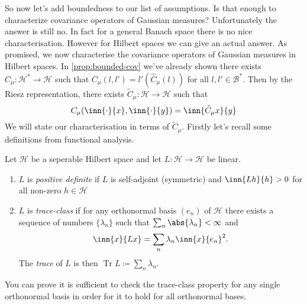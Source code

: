 \documentclass[fontsize=12pt, DIV=12]{scrreprt}
\newcommand{\defeq}{\coloneqq}
\newcommand{\calB}{\mathcal B}
\newcommand{\calH}{\mathcal H}
\DeclareMathOperator{\tr}{Tr}
\begin{document}
So now let's add boundedness to our list of assumptions. Is that enough to characterize covariance operators of Gaussian measures? Unfortunately the answer is still no. In fact for a general Banach space there is no nice characterisation. However for Hilbert spaces we can give an actual answer.
As promised, we now characterise the covariance operators of Gaussian measures in Hilbert spaces. In \vref{prop:bounded-cov} we've already shown there exists $\hat{C}_{\mu}: \calH^* \to \calH$ such that $C_{\mu}(l, l') = l'(\hat{C}_{\mu}(l))$ for all $l, l' \in \calB^*$. Then by the Riesz representation, there exists $\tilde{C}_{\mu}: \calH \to \calH$ such that
\begin{equation}
	C_{\mu}(\inn{\cdot}{x}, \inn{\cdot}{y}) = \inn{\tilde{C}_{\mu}x}{y}
\end{equation}
We will state our characterisation in terms of $\tilde{C}_{\mu}$. Firstly let's recall some definitions from functional analysis.
\begin{defn}
	Let $\calH$ be a seperable Hilbert space and let $L: \calH \to \calH$ be linear.
	\begin{enumerate}
		\item $L$ is \emph{positive definite} if $L$ is self-adjoint (symmetric) and $\inn{L h}{h} > 0$ for all non-zero $h \in \calH$
		\item $L$ is \emph{trace-class} if for any orthonormal basis $(e_n)$ of $\calH$ there exists a sequence of numbers $\{\lambda_n\}$ such that $\sum_n \abs{\lambda_n} < \infty$ and
			\begin{equation}
				\inn{x}{Lx} = \sum_n \lambda_n \inn{x}{e_n}^2.
			\end{equation}
			The \emph{trace} of $L$ is then $\tr L \defeq \sum_n \lambda _n$.
	\end{enumerate}
\end{defn}
You can prove it is sufficient to check the trace-class property for any single orthonormal basis in order for it to hold for all orthonormal bases.
\end{document}
